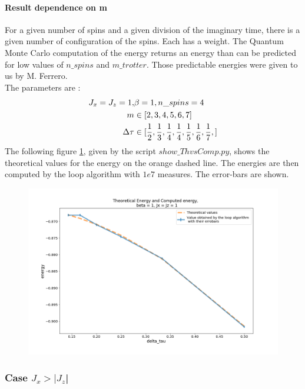 \documentclass[a4paper,12pt]{article}
\begin{document}
	\paragraph{Result dependence on m}
	For a given number of spins and a given division of the imaginary time, there is a given number of configuration of the spins. Each has a weight. The Quantum Monte Carlo computation of the energy returns an energy than can be predicted for low values of $n\_spins$ and $m\_trotter$. Those predictable energies were given to us by M. Ferrero. \\ The parameters are :
	\begin{equation}
		\centering
		\begin{split}
			J_x = J_z = 1, & \beta = 1, n\_spins = 4 \\
			m & \in [2, 3, 4, 5, 6, 7] \\
			\Delta\tau & \in [\frac{1}{2}, \frac{1}{3}, \frac{1}{4}, \frac{1}{4}, \frac{1}{5}, \frac{1}{6}, \frac{1}{7}, ]
		\end{split}
	\end{equation}
	The following figure \ref{varymx=y}, given by the script $show\_ThvsComp.py$, shows the theoretical values for the energy on the orange dashed line. The energies are then computed by the loop algorithm with $1e7$ measures. The error-bars are shown.
	\begin{figure}[!h]
		\centering
		\includegraphics[width=12cm]{ThvsComp_x=z=1_m2-8.png}
		\caption{ }
		\label{varymx=y}
	\end{figure}
	
	\newpage
	\subsubsection{Case $J_{x} > |J_{z}$|}
	
\end{document}
